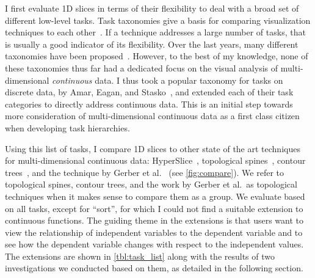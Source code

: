 I first evaluate 1D slices in terms of their flexibility to deal with a broad
set of different low-level tasks.  Task taxonomies give a basis for comparing
visualization techniques to each other~\cite{Munzner:2014}.
If a technique addresses a large number of tasks, that is usually a good
indicator of its flexibility.  Over the last years, many different taxonomies
have been proposed~\cite{Amar:2005,Brehmer:2013,Heer:2012,Sedlmair:2014}.
However, to the best of my knowledge, none of these taxonomies thus far had a
dedicated focus on the visual analysis of multi-dimensional \textit{continuous}
data. I thus took a popular taxonomy for tasks on discrete data, by Amar,
Eagan, and Stasko~\cite{Amar:2005}, and extended each of their task categories
to directly address continuous data. This is an initial step towards
more consideration of multi-dimensional continuous data as a first class
citizen when developing task hierarchies.

Using this list of tasks, I compare 1D slices to other state of the art
techniques for multi-dimensional continuous data: HyperSlice~\cite{Wijk:1993},
topological spines~\cite{Correa:2011}, contour trees~\cite{Carr:2003}, and the
technique by Gerber et al.~\cite{Gerber:2010} (see \autoref{fig:compare}).  We
refer to topological spines, contour trees, and the work by Gerber et al.\ as
topological techniques when it makes sense to compare them as a group.
We evaluate based on all tasks, except for ``sort'', for which I could not
find a suitable extension to continuous functions.  The guiding theme in the
extensions is that users want to view the relationship of independent variables
to the dependent variable and to see how the dependent variable changes with
respect to the independent values.  The extensions are shown in
\autoref{tbl:task_list} along with the results of two investigations we
conducted based on them, as detailed in the following section.





%


